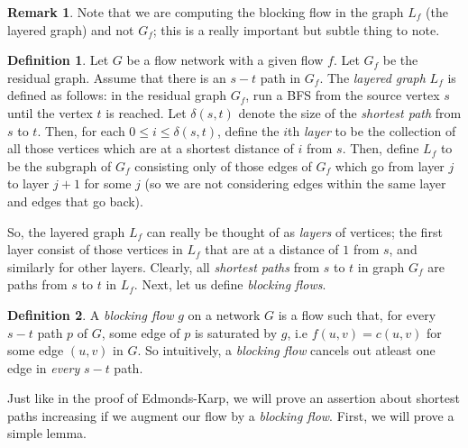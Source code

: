 \documentclass[12pt,a4paper]{amsart}
\numberwithin{equation}{section}
\theoremstyle{definition}
\newtheorem{Def}{Definition}[section]
\newtheorem{Remark}{Remark}[Th]
\begin{document}
\begin{Remark}
	Note that we are computing the blocking flow in the graph $L_f$ (the layered graph) and not $G_f$; this is a really important but subtle thing to note. 
\end{Remark}

\begin{Def}
	Let $G$ be a flow network with a given flow $f$. Let $G_f$ be the residual graph. Assume that there is an $s-t$ path in $G_f$. The \textit{layered graph} $L_f$ is defined as follows: in the residual graph $G_f$, run a BFS from the source vertex $s$ until the vertex $t$ is reached. Let $\delta(s, t)$ denote the size of the \textit{shortest path} from $s$ to $t$. Then, for each $0\le i\le \delta(s, t)$, define the $i$th \textit{layer} to be the collection of all those vertices which are at a shortest distance of $i$ from $s$. Then, define $L_f$ to be the subgraph of $G_f$ consisting only of those edges of $G_f$ which go from layer $j$ to layer $j + 1$ for some $j$ (so we are not considering edges within the same layer and edges that go back). 
\end{Def}
So, the layered graph $L_f$ can really be thought of as \textit{layers} of vertices; the first layer consist of those vertices in $L_f$ that are at a distance of $1$ from $s$, and similarly for other layers. Clearly, all \textit{shortest paths} from $s$ to $t$ in graph $G_f$ are paths from $s$ to $t$ in $L_f$. Next, let us define \textit{blocking flows}. 

\begin{Def}
	A \textit{blocking flow} $g$ on a network $G$ is a flow such that, for every $s-t$ path $p$ of $G$, some edge of $p$ is saturated by $g$, i.e $f(u, v) = c(u, v)$ for some edge $(u, v)$ in $G$. So intuitively, a \textit{blocking flow} cancels out atleast one edge in \textit{every} $s-t$ path. 
\end{Def}
Just like in the proof of Edmonds-Karp, we will prove an assertion about shortest paths increasing if we augment our flow by a \textit{blocking flow}. First, we will prove a simple lemma. 
\end{document}
